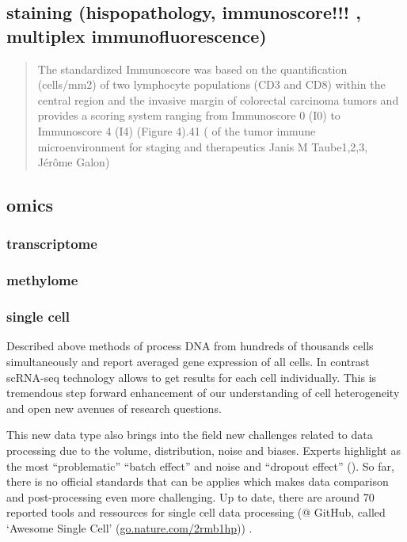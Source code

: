 \documentclass[12pt,]{book}
\theoremstyle{definition}
\theoremstyle{definition}
\theoremstyle{definition}
\theoremstyle{remark}
\begin{document}
\hypertarget{staining-hispopathology-immunoscore-multiplex-immunofluorescence}{%
\subsection{staining (hispopathology, immunoscore!!! , multiplex
immunofluorescence)}\label{staining-hispopathology-immunoscore-multiplex-immunofluorescence}}

\begin{quote}
The standardized Immunoscore was based on the quantification (cells/mm2)
of two lymphocyte populations (CD3 and CD8) within the central region
and the invasive margin of colorectal carcinoma tumors and provides a
scoring system ranging from Immunoscore 0 (I0) to Immunoscore 4 (I4)
(Figure 4).41 (\citet{Implications} of the tumor immune microenvironment
for staging and therapeutics Janis M Taube1,2,3, Jérôme Galon)
\end{quote}

\hypertarget{omics}{%
\subsection{omics}\label{omics}}

\hypertarget{transcriptome}{%
\subsubsection{transcriptome}\label{transcriptome}}

\hypertarget{methylome}{%
\subsubsection{methylome}\label{methylome}}

\hypertarget{single-cell}{%
\subsubsection{single cell}\label{single-cell}}

Described above methods of process DNA from hundreds of thousands cells
simultaneously and report averaged gene expression of all cells. In
contrast scRNA-seq technology allows to get results for each cell
individually. This is tremendous step forward enhancement of our
understanding of cell heterogeneity and open new avenues of research
questions.

This new data type also brings into the field new challenges related to
data processing due to the volume, distribution, noise and biases.
Experts highlight as the most ``problematic'' ``batch effect'' and noise
and ``dropout effect''
(\citet{https://www.nature.com/news/single-cell-sequencing-made-simple-1.22233}).
So far, there is no official standards that can be applies which makes
data comparison and post-processing even more challenging. Up to date,
there are around 70 reported tools and ressources for single cell data
processing (@ GitHub, called `Awesome Single Cell'
(\href{http://go.nature.com/2rmb1hp}{go.nature.com/2rmb1hp})) .
\end{document}
